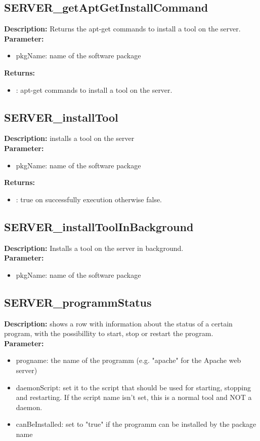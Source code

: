 \subsection{SERVER\_getAptGetInstallCommand}
\textbf{Description:} Returns the apt-get commands to install a tool on the server.\\
\textbf{Parameter:}
\begin{itemize}
\item pkgName: name of the software package
\end{itemize}
\textbf{Returns:}
\begin{itemize}
\item : apt-get commands to install a tool on the server.
\end{itemize}

\subsection{SERVER\_installTool}
\textbf{Description:} installs a tool on the server\\
\textbf{Parameter:}
\begin{itemize}
\item pkgName: name of the software package
\end{itemize}
\textbf{Returns:}
\begin{itemize}
\item : true on successfully execution otherwise false.
\end{itemize}

\subsection{SERVER\_installToolInBackground}
\textbf{Description:} Installs a tool on the server in background.\\
\textbf{Parameter:}
\begin{itemize}
\item pkgName: name of the software package
\end{itemize}

\subsection{SERVER\_programmStatus}
\textbf{Description:} shows a row with information about the status of a certain program, with the possibillity to start, stop or restart the program.\\
\textbf{Parameter:}
\begin{itemize}
\item progname: the name of the programm (e.g. "apache" for the Apache web server)
\item daemonScript: set it to the script that should be used for starting, stopping and restarting. If the script name isn't set, this is a normal tool and NOT a daemon.
\item canBeInstalled: set to "true" if the programm can be installed by the package name
\end{itemize}

